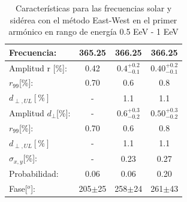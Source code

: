 \begin{table}[H]
        \begin{small}
            \begin{center}
                \begin{tabular}[c]{l|c||c|c}
                    Frecuencia:             & 365.25	    & 366.25		& 366.25\cite{Aab_2020}\\
                    \hline
                    Amplitud r [\%]:        & 0.42          & $0.4^{+0.2}_{-0.1}$ 	        & $0.40^{+0.2}_{-0.1}$\cite{codigo}  \\
                    $r_{99}$[\%]:           & 0.70	        & 0.6          & 0.8\cite{codigo}  \\
                    $d_{\perp,UL}[\%]$      & -             & 1.1          & 1.1\\                    
                    \hline
                    Amplitud $d_\perp$[\%]: & -             & $0.6^{+0.3}_{-0.2}$           & $0.50^{+0.3}_{-0.2}$\\
                    $r_{99}$[\%]:           & 0.70	        & 0.6          & 0.8\cite{codigo}  \\
                    $d_{\perp,UL}[\%]$      & -             & 1.1          & 1.1\\

                    $\sigma_{x,y}$[\%]:     & -	            & 0.23	        & 0.27       \\
                    Probabilidad:           & 0.06          & 0.06	        & 0.20\\
                    Fase[$^o$]:             & 205$\pm$25	& 258$\pm$24	& 261$\pm$43\cite{discrepancia}   \\
                \end{tabular}
            \end{center}
        \end{small}
        \caption{Características para las frecuencias solar y sidérea con el método East-West en el primer armónico en rango de energía 0.5 EeV - 1 EeV}
        \label{tab:solar}
    \end{table}


